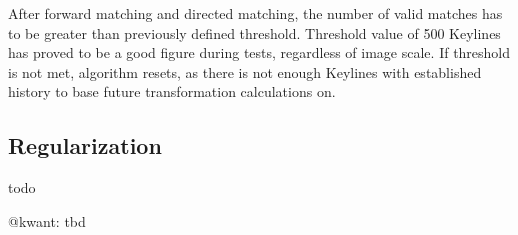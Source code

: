 After forward matching and directed matching, the number of valid matches has to be greater than previously defined threshold. Threshold value of 500 Keylines has proved to be a good figure during tests, regardless of image scale.  If threshold is not met, algorithm resets, as there is not enough Keylines with established history to base future transformation calculations on.

\subsection{Regularization}

%
%

todo

@kwant: tbd



%
%
%
%


